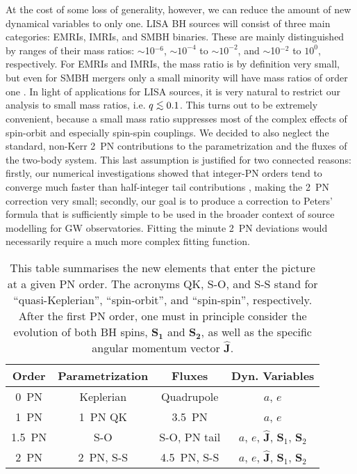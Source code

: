 \documentclass[usenatbib]{mnras}
\def\lsim{\mathrel{\rlap{\lower 3pt \hbox{$\sim$}} \raise 2.0pt \hbox{$<$}}}
\newcommand\T{\rule{0pt}{2.8ex}}       %
\newcommand\B{\rule[-1.4ex]{0pt}{0pt}} %
\begin{document}
At the cost of some loss of generality, however, we can reduce the amount of new dynamical variables to only one. LISA BH sources will consist of three main categories: EMRIs, IMRIs, and SMBH binaries. These are mainly distinguished by ranges of their mass ratios: $\sim$10$^{-6}$, $\sim$$10^{-4}$ to $\sim$$10^{-2}$, and $\sim$10$^{-2}$ to $10^{0}$, respectively. For EMRIs and IMRIs, the mass ratio is by definition very small, but even for SMBH mergers only a small minority will have mass ratios of order one \citep[see, e.g.][where we assume that galaxy mass is a tracer for SMBH mass]{OLeary_et_al_2021}. In light of applications for LISA sources, it is very natural to restrict our analysis to small mass ratios, i.e. $q \lsim 0.1$. This turns out to be extremely convenient, because a small mass ratio suppresses most of the complex effects of spin-orbit and especially spin-spin couplings. We decided to also neglect the standard, non-Kerr 2~PN contributions to the parametrization and the fluxes of the two-body system. This last assumption is justified for two connected reasons: firstly, our numerical investigations showed that integer-PN orders tend to converge much faster than half-integer tail contributions \citep[see also][]{Blanchet2014}, making the 2~PN correction very small; secondly, our goal is to produce a correction to Peters' formula that is sufficiently simple to be used in the broader context of source modelling for GW observatories. Fitting the minute 2~PN deviations would necessarily require a much more complex fitting function.

\begin{table}
    \centering
    \begin{tabular}{c|c|c|c}
      Order & Parametrization  & Fluxes & Dyn. Variables \T \B \\
       \hline
        0~PN & Keplerian & Quadrupole & $a$, $e$ \T \B \\
        1~PN & 1~PN QK & 3.5~PN & $a$, $e$ \T \B \\
        1.5~PN & S-O  & S-O, PN tail & $a$, $e$, $\mathbf{\hat{J}}$,  $\mathbf{S}_1$, $\mathbf{S}_2$ \T \B \\
        2~PN & 2~PN, S-S  & 4.5~PN, S-S & $a$, $e$, $\mathbf{\hat{J}}$,  $\mathbf{S}_1$, $\mathbf{S}_2$ \T \B
    \end{tabular}
    \caption{This table summarises the new elements that enter the picture at a given PN order. The acronyms QK, S-O, and S-S stand for ``quasi-Keplerian'', ``spin-orbit'', and ``spin-spin'', respectively. After the first PN order, one must in principle consider the evolution of both BH spins, $\mathbf{S_1}$ and $\mathbf{S_2}$, as well as the specific angular momentum vector $\mathbf{\hat{J}}$.}
    \label{tab:table1}
\end{table}
\end{document}
